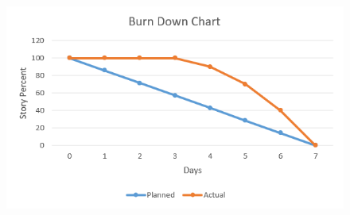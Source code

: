 \documentclass[12pt,a4paper]{article}
\begin{document}
	\begin{figure}[h!]
	\begin{center}
		\includegraphics[width=14cm]{images/Burn Down Chart.png}
		
	\end{center}
	\caption{}
\end{figure}
\end{document}

